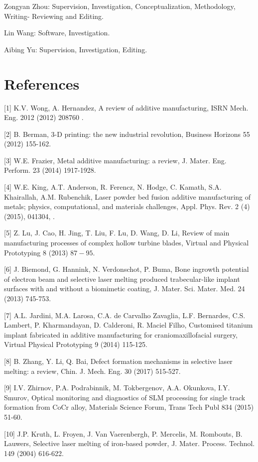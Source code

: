 \documentclass[10pt]{article}
\begin{document}
Zongyan Zhou: Supervision, Investigation, Conceptualization, Methodology, Writing- Reviewing and Editing.

Lin Wang: Software, Investigation.

Aibing Yu: Supervision, Investigation, Editing.

\section*{References}
[1] K.V. Wong, A. Hernandez, A review of additive manufacturing, ISRN Mech. Eng. 2012 (2012) 208760 .

[2] B. Berman, 3-D printing: the new industrial revolution, Business Horizons 55 (2012) 155-162.

[3] W.E. Frazier, Metal additive manufacturing: a review, J. Mater. Eng. Perform. 23 (2014) 1917-1928.

[4] W.E. King, A.T. Anderson, R. Ferencz, N. Hodge, C. Kamath, S.A. Khairallah, A.M. Rubenchik, Laser powder bed fusion additive manufacturing of metals; physics, computational, and materials challenges, Appl. Phys. Rev. 2 (4) (2015), 041304, .

[5] Z. Lu, J. Cao, H. Jing, T. Liu, F. Lu, D. Wang, D. Li, Review of main manufacturing processes of complex hollow turbine blades, Virtual and Physical Prototyping 8 (2013) $87-95$.

[6] J. Biemond, G. Hannink, N. Verdonschot, P. Buma, Bone ingrowth potential of electron beam and selective laser melting produced trabecular-like implant surfaces with and without a biomimetic coating, J. Mater. Sci. Mater. Med. 24 (2013) 745-753.

[7] A.L. Jardini, M.A. Larosa, C.A. de Carvalho Zavaglia, L.F. Bernardes, C.S. Lambert, P. Kharmandayan, D. Calderoni, R. Maciel Filho, Customised titanium implant fabricated in additive manufacturing for craniomaxillofacial surgery, Virtual Physical Prototyping 9 (2014) 115-125.

[8] B. Zhang, Y. Li, Q. Bai, Defect formation mechanisms in selective laser melting: a review, Chin. J. Mech. Eng. 30 (2017) 515-527.

[9] I.V. Zhirnov, P.A. Podrabinnik, M. Tokbergenov, A.A. Okunkova, I.Y. Smurov, Optical monitoring and diagnostics of SLM processing for single track formation from CoCr alloy, Materials Science Forum, Trans Tech Publ 834 (2015) 51-60.

[10] J.P. Kruth, L. Froyen, J. Van Vaerenbergh, P. Mercelis, M. Rombouts, B. Lauwers, Selective laser melting of iron-based powder, J. Mater. Process. Technol. 149 (2004) 616-622.
\end{document}

